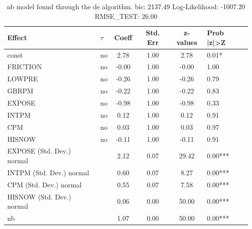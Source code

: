 \begin{table}
	\caption{nb model found through the de algorithm. bic: 2137.49 Log-Likelihood: -1007.20 RMSE_TEST: 26.00}
	\begin{center}
		\begin{tabular}{|l|l|c|c|c|l|}
			\hline
			Effect & $\tau$ & Coeff & Std. Err & z-values & Prob |z|>Z \\
			\hline
			const & no & 2.78 & 1.00 & 2.78 & 0.01* \\
			\hline
			FRICTION & no & -0.00 & 1.00 & -0.00 & 1.00 \\
			\hline
			LOWPRE & no & -0.26 & 1.00 & -0.26 & 0.79 \\
			\hline
			GBRPM & no & -0.22 & 1.00 & -0.22 & 0.83 \\
			\hline
			EXPOSE & no & -0.98 & 1.00 & -0.98 & 0.33 \\
			\hline
			INTPM & no & 0.12 & 1.00 & 0.12 & 0.91 \\
			\hline
			CPM & no & 0.03 & 1.00 & 0.03 & 0.97 \\
			\hline
			HISNOW & no & -0.11 & 1.00 & -0.11 & 0.91 \\
			\hline
			EXPOSE (Std. Dev.) normal &  & 2.12 & 0.07 & 29.42 & 0.00*** \\
			\hline
			INTPM (Std. Dev.) normal &  & 0.60 & 0.07 & 8.27 & 0.00*** \\
			\hline
			CPM (Std. Dev.) normal &  & 0.55 & 0.07 & 7.58 & 0.00*** \\
			\hline
			HISNOW (Std. Dev.) normal &  & 0.06 & 0.00 & 50.00 & 0.00*** \\
			\hline
			nb &  & 1.07 & 0.00 & 50.00 & 0.00*** \\
			\hline
		\end{tabular}
	\end{center}
\end{table}